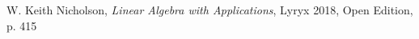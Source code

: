 \documentclass{ximera}
\begin{document}
W. Keith Nicholson, {\it Linear Algebra with Applications}, Lyryx 2018, Open Edition, p. 415 




\end{document}
